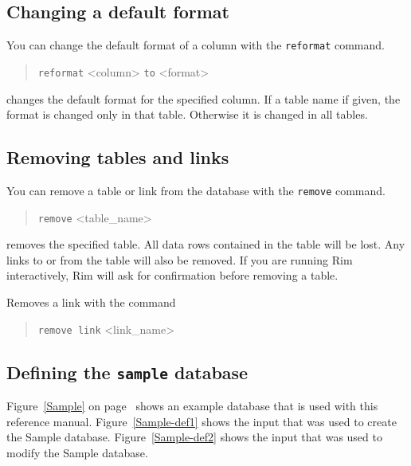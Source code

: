 \documentclass[11pt,a4paper]{report}
\begin{document}
\subsection{Changing a default format}
You can change the default format of a column with the \verb!reformat! command.
\begin{verse}
  \verb!reformat! <column> \verb!to! <format> 
\end{verse}
changes the default format for the specified column.
If a table name if given, the
format is changed only in that table. Otherwise it
is changed in all tables.
 
\subsection{Removing tables and links}
%
You can remove a table or link from the database with the \verb!remove! command.
\begin{verse}
\verb|remove|  <table\_name>
\end{verse}
removes the specified table.  All data rows contained in the
table will be lost.  Any links to or from the table
will also be removed.
If you are running Rim interactively, Rim will ask for
confirmation before removing a table.
 
Removes a link with the command
\begin{verse}
\verb|remove link| <link\_name>
\end{verse}

\subsection{Defining the {\tt sample} database}
Figure~\ref{Sample} on page~\pageref{Sample} shows an example
database that is used
with this reference manual.  Figure~\ref{Sample-def1}
shows the input that was used to create the Sample database.
Figure~\ref{Sample-def2}
shows the input that was used to modify the Sample database.
 
\end{document}
